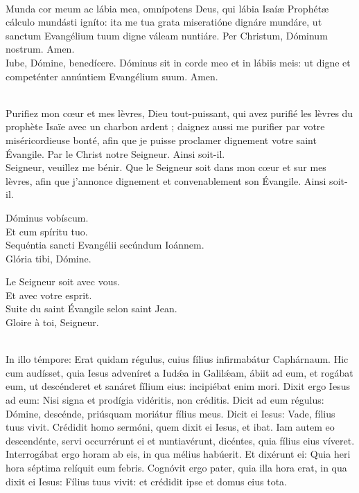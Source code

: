 \documentclass[twoside]{article}
\begin{document}
\begin{paracol}{2}

\\
Munda cor meum ac lábia mea, omnípotens Deus, qui lábia Isaíæ Prophétæ cálculo mundásti igníto: ita me tua grata miseratióne dignáre mundáre, ut sanctum Evangélium tuum digne váleam nuntiáre. Per Christum, Dóminum nostrum. Amen.\\
Iube, Dómine, benedícere. Dóminus sit in corde meo et in lábiis meis: ut digne et competénter annúntiem Evangélium suum. Amen.

\switchcolumn

~\\
Puriﬁez mon cœur et mes lèvres, Dieu tout-puissant, qui avez puriﬁé les lèvres du prophète Isaïe avec un charbon ardent ; daignez aussi me puriﬁer par votre miséricordieuse bonté, aﬁn que je puisse proclamer dignement votre saint Évangile. Par le Christ notre Seigneur. Ainsi soit-il. \\
Seigneur, veuillez me bénir. Que le Seigneur soit dans mon cœur et sur mes lèvres, aﬁn que j’annonce dignement et convenablement son Évangile. Ainsi soit-il.

\switchcolumn*

\vv Dóminus vobíscum.\\
\rr Et cum spíritu tuo.\\
\vv Sequéntia \cc sancti Evangélii secúndum Ioánnem.\\
\rr Glória tibi, Dómine.

\switchcolumn

\vv Le Seigneur soit avec vous.\\
\rr Et avec votre esprit.\\
\vv Suite du saint Évangile selon saint Jean.\\
\rr Gloire à toi, Seigneur.

\switchcolumn*

\\
In illo témpore: Erat quidam régulus, cuius fílius infirmabátur Caphárnaum. Hic cum audísset, quia Iesus adveníret a Iudǽa in Galilǽam, ábiit ad eum, et rogábat eum, ut descénderet et sanáret fílium eius: incipiébat enim mori. Dixit ergo Iesus ad eum: Nisi signa et prodígia vidéritis, non créditis. Dicit ad eum régulus: Dómine, descénde, priúsquam moriátur fílius meus. Dicit ei Iesus: Vade, fílius tuus vivit. Crédidit homo sermóni, quem dixit ei Iesus, et ibat. Iam autem eo descendénte, servi occurrérunt ei et nuntiavérunt, dicéntes, quia fílius eius víveret. Interrogábat ergo horam ab eis, in qua mélius habúerit. Et dixérunt ei: Quia heri hora séptima relíquit eum febris. Cognóvit ergo pater, quia illa hora erat, in qua dixit ei Iesus: Fílius tuus vivit: et crédidit ipse et domus eius tota.


\end{paracol}
\end{document}
